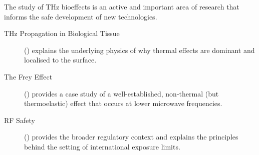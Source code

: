 \begin{importantbox}[title={Further Reading}]
    The study of THz bioeffects is an active and important area of research that informs the safe development of new technologies.
    \begin{description}
        \item[THz Propagation in Biological Tissue] () explains the underlying physics of why thermal effects are dominant and localised to the surface.
        \item[The Frey Effect] () provides a case study of a well-established, non-thermal (but thermoelastic) effect that occurs at lower microwave frequencies.
        \item[RF Safety] () provides the broader regulatory context and explains the principles behind the setting of international exposure limits.
    \end{description}
\end{importantbox}
